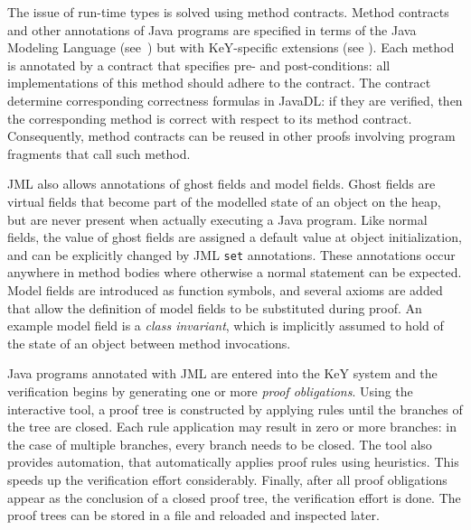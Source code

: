 The issue of run-time types is solved using method contracts. Method contracts and other annotations of Java programs are specified in terms of the Java Modeling Language (see~\cite{leavens2013jml}) but with KeY-specific extensions (see \cite[Chapter 7]{KeYbook}). Each method is annotated by a contract that specifies pre- and post-conditions: all implementations of this method should adhere to the contract. The contract determine corresponding correctness formulas in JavaDL: if they are verified, then the corresponding method is correct with respect to its method contract. Consequently, method contracts can be reused in other proofs involving program fragments that call such method.

JML also allows annotations of ghost fields and model fields. Ghost fields are virtual fields that become part of the modelled state of an object on the heap, but are never present when actually executing a Java program. Like normal fields, the value of ghost fields are assigned a default value at object initialization, and can be explicitly changed by JML \texttt{set} annotations. These annotations occur anywhere in method bodies where otherwise a normal statement can be expected. Model fields are introduced as function symbols, and several axioms are added that allow the definition of model fields to be substituted during proof. An example model field is a \emph{class invariant}, which is implicitly assumed to hold of the state of an object between method invocations.

Java programs annotated with JML are entered into the KeY system and the verification begins by generating one or more \emph{proof obligations}. Using the interactive tool, a proof tree is constructed by applying rules until the branches of the tree are closed. Each rule application may result in zero or more branches: in the case of multiple branches, every branch needs to be closed. The tool also provides automation, that automatically applies proof rules using heuristics. This speeds up the verification effort considerably. Finally, after all proof obligations appear as the conclusion of a closed proof tree, the verification effort is done. The proof trees can be stored in a file and reloaded and inspected later.
